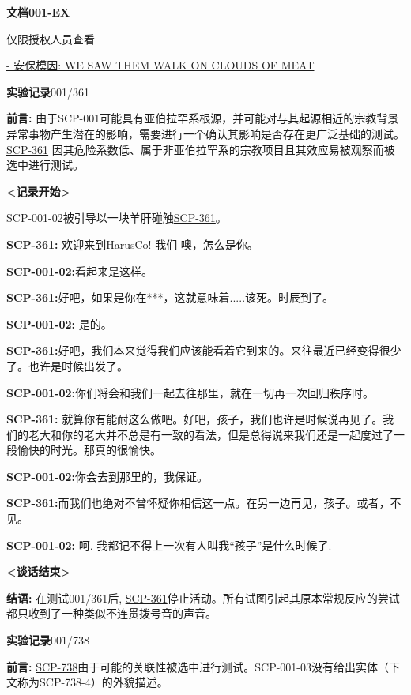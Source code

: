 \documentclass[openany,a4paper]{book} %
\begin{document}
\vspace{12pt}

\textbf{文档001-EX}

{\tiny 仅限授权人员查看}
\begin{colorboxed}
{\color{red}\uline{- 安保模因: WE SAW THEM WALK ON CLOUDS OF MEAT}}\vspace{12pt}

\textbf{实验记录}001/361

\textbf{前言:} 由于SCP-001可能具有亚伯拉罕系根源，并可能对与其起源相近的宗教背景异常事物产生潜在的影响，需要进行一个确认其影响是否存在更广泛基础的测试。\hyperref[chhap:SCP-361]{SCP-361} 因其危险系数低、属于非亚伯拉罕系的宗教项目且其效应易被观察而被选中进行测试。

\textbf{<记录开始>}

SCP-001-02被引导以一块羊肝碰触\hyperref[chhap:SCP-361]{SCP-361}。

\textbf{SCP-361:} 欢迎来到HarusCo! 我们-噢，怎么是你。

\textbf{SCP-001-02:}看起来是这样。

\textbf{SCP-361:}好吧，如果是你在***，这就意味着.....该死。时辰到了。

\textbf{SCP-001-02:} 是的。

\textbf{SCP-361:}好吧，我们本来觉得我们应该能看着它到来的。来往最近已经变得很少了。也许是时候出发了。

\textbf{SCP-001-02:}你们将会和我们一起去往那里，就在一切再一次回归秩序时。

\textbf{SCP-361:} 就算你有能耐这么做吧。好吧，孩子，我们也许是时候说再见了。我们的老大和你的老大并不总是有一致的看法，但是总得说来我们还是一起度过了一段愉快的时光。那真的很愉快。

\textbf{SCP-001-02:}你会去到那里的，我保证。

\textbf{SCP-361:}而我们也绝对不曾怀疑你相信这一点。在另一边再见，孩子。或者，不见。

\textbf{SCP-001-02:} 呵. 我都记不得上一次有人叫我“孩子”是什么时候了.

\textbf{<谈话结束>}

\textbf{结语: }在测试001/361后, \hyperref[chhap:SCP-361]{SCP-361}停止活动。所有试图引起其原本常规反应的尝试都只收到了一种类似不连贯拨号音的声音。\vspace{12pt}

\textbf{实验记录}001/738

\textbf{前言: }\hyperref[chhap:SCP-738]{SCP-738}由于可能的关联性被选中进行测试。SCP-001-03没有给出实体（下文称为SCP-738-4）的外貌描述。


\end{colorboxed}
\end{document}
